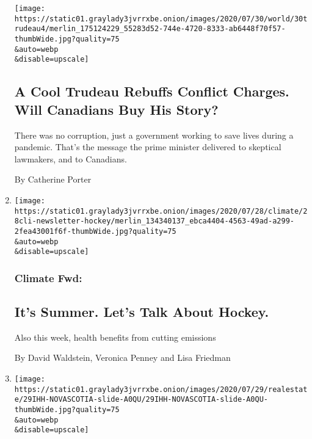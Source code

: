 \begin{enumerate}
  \texttt{[image: https://static01.graylady3jvrrxbe.onion/images/2020/07/30/world/30trudeau4/merlin\_175124229\_55283d52-744e-4720-8333-ab6448f70f57-thumbWide.jpg?quality=75\\\&auto=webp\\\&disable=upscale]}

  \hypertarget{a-cool-trudeau-rebuffs-conflict-charges-will-canadians-buy-his-story}{%
  \subsection{A Cool Trudeau Rebuffs Conflict Charges. Will Canadians
  Buy His
  Story?}\label{a-cool-trudeau-rebuffs-conflict-charges-will-canadians-buy-his-story}}

  There was no corruption, just a government working to save lives
  during a pandemic. That's the message the prime minister delivered to
  skeptical lawmakers, and to Canadians.

  By Catherine Porter
\item
  \href{/2020/07/29/climate/skating-hockey-climate-change.html}{}

  \texttt{[image: https://static01.graylady3jvrrxbe.onion/images/2020/07/28/climate/28cli-newsletter-hockey/merlin\_134340137\_ebca4404-4563-49ad-a299-2fea43001f6f-thumbWide.jpg?quality=75\\\&auto=webp\\\&disable=upscale]}

  \hypertarget{climate-fwd}{%
  \subsubsection{Climate Fwd:}\label{climate-fwd}}

  \hypertarget{its-summer-lets-talk-about-hockey}{%
  \subsection{It's Summer. Let's Talk About
  Hockey.}\label{its-summer-lets-talk-about-hockey}}

  Also this week, health benefits from cutting emissions

  By David Waldstein, Veronica Penney and Lisa Friedman
\item
  \href{/2020/07/29/realestate/house-hunting-in-nova-scotia-a-sprawling-seaside-villa-for-2-million.html}{}

  \texttt{[image: https://static01.graylady3jvrrxbe.onion/images/2020/07/29/realestate/29IHH-NOVASCOTIA-slide-A0QU/29IHH-NOVASCOTIA-slide-A0QU-thumbWide.jpg?quality=75\\\&auto=webp\\\&disable=upscale]}

  \hypertarget{international-real-estate}{%
}
\end{enumerate}
